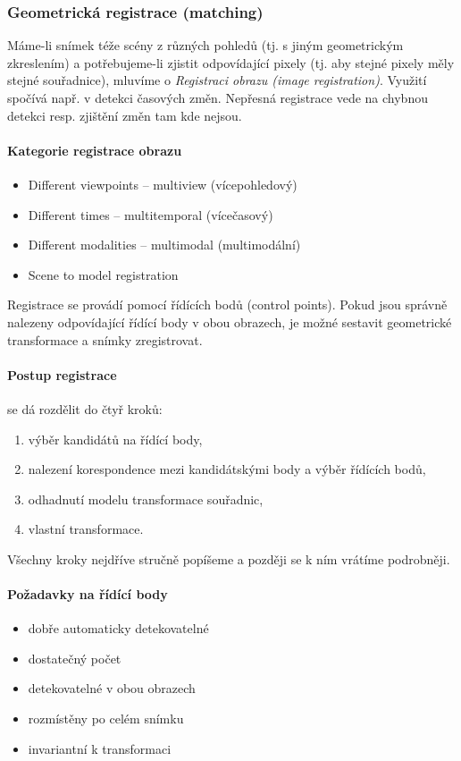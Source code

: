 \subsubsection{Geometrická registrace (matching)}

Máme-li snímek téže scény z různých pohledů (tj. s jiným geometrickým zkreslením) a potřebujeme-li zjistit odpovídající
pixely (tj. aby stejné pixely měly stejné souřadnice), mluvíme o \emph{Registraci obrazu (image registration)}. Využití
spočívá např. v detekci časových změn. Nepřesná registrace vede na chybnou detekci resp. zjištění změn tam kde nejsou.

\paragraph{Kategorie registrace obrazu}
\begin{itemize}
	\item Different viewpoints -- multiview (vícepohledový)
	\item Different times -- multitemporal (vícečasový)
	\item Different modalities -- multimodal (multimodální)
	\item Scene to model registration
\end{itemize}

Registrace se provádí pomocí řídících bodů (control points). Pokud jsou správně nalezeny odpovídající řídící body v obou
obrazech, je možné sestavit geometrické transformace a snímky zregistrovat.

\paragraph{Postup registrace} se dá rozdělit do čtyř kroků:
\begin{enumerate}
	\item výběr kandidátů na řídící body,
	\item nalezení korespondence mezi kandidátskými body a výběr řídících bodů,
	\item odhadnutí modelu transformace souřadnic,
	\item vlastní transformace.
\end{enumerate}
Všechny kroky nejdříve stručně popíšeme a později se k ním vrátíme podrobněji.

\paragraph{Požadavky na řídící body}
\begin{itemize}
\item dobře automaticky detekovatelné
\item dostatečný počet
\item detekovatelné v obou obrazech
\item rozmístěny po celém snímku
\item invariantní k transformaci
\end{itemize}


